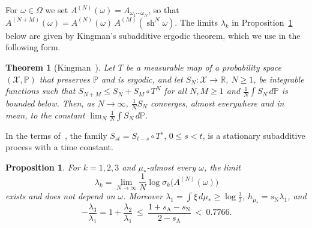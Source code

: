 \documentclass[11pt]{amsart}
\newtheorem{proposition}{Proposition}[section]
\newtheorem{lettertheorem}{Theorem}%
\theoremstyle{definition}
\theoremstyle{remark}
\newcommand{\R}{\mathbb R}
\newcommand{\sN}{s_{\mathrm N}}
\newcommand{\sA}{s_{\mathrm A}}
\begin{document}
For $\omega\in\Omega$ we set $A^{(N)}(\omega)=A_{\omega_1\cdots\omega_N}$, so that $A^{(N+M)}(\omega)=A^{(N)}(\omega)\,A^{(M)}(\operatorname{sh}^N\omega)$.
The limits $\lambda_k$ in Proposition~\ref{prop:lyap} below are given by Kingman's subadditive ergodic theorem, which we use in the following form.

\begin{lettertheorem}[Kingman~{\cite[Thms.~1, 3 and~5]{Kin68}}]\label{thm:kingman}
Let $T$ be a measurable map of a probability space $(\mathcal X,\mathbb P)$ that preserves $\mathbb P$ and is ergodic, and let $S_N:\mathcal X\to\R$, $N\ge1$, be integrable functions such that $S_{N+M}\le S_N+S_M\circ T^N$ for all $N,M\ge1$ and $\frac1N\int S_N\,d\mathbb P$ is bounded below. Then, as $N\to\infty$, $\frac1NS_N$ converges, almost everywhere and in mean, to the constant $\lim_N\frac1N\int S_N\,d\mathbb P$.
\end{lettertheorem}

In the terms of~\cite[\S1]{Kin68}, the family $S_{st}=S_{t-s}\circ T^s$, $0\le s<t$, is a stationary subadditive process with a time constant.

\begin{proposition}\label{prop:lyap}
For $k=1,2,3$ and $\mu_*$-almost every $\omega$, the limit
$$
\lambda_k=\lim_{N\to\infty}\frac1N\log\sigma_k\bigl(A^{(N)}(\omega)\bigr)
$$
exists and does not depend on $\omega$. Moreover $\lambda_1=\int\xi\,d\mu_*\ge\log\frac32$, $h_{\mu_*}=\sN\lambda_1$, and
\[
  -\frac{\lambda_3}{\lambda_1}=1+\frac{\lambda_2}{\lambda_1}\ \le\ \frac{1+\sA-\sN}{2-\sA}\ <\ 0.7766 .
\]
\end{proposition}
\end{document}
